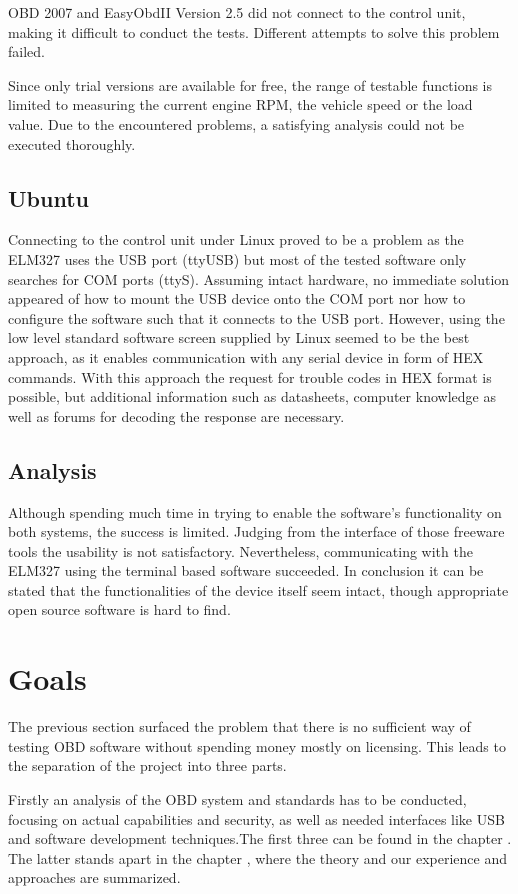 OBD 2007 and EasyObdII Version 2.5 did not connect to the control unit, making it difficult to conduct the tests. 
Different attempts to solve this problem failed.

Since only trial versions are available for free, the range of testable functions is limited to measuring the current engine RPM, the vehicle 
speed or the load value. Due to the encountered problems, a satisfying analysis could not be executed thoroughly.

\subsection{Ubuntu}
Connecting to the control unit under Linux proved to be a problem as the ELM327 uses the USB port (ttyUSB) but most of the tested software only 
searches for COM ports (ttyS).
Assuming intact hardware, no immediate solution appeared of how to mount the USB device onto the COM port nor how to configure the software such that 
it connects to the USB port. However, using the low level standard software screen supplied by Linux seemed to be the best approach, as it enables 
communication with any serial device in form of HEX commands. With this approach the request for trouble codes in HEX format is possible, but 
additional information such as datasheets, computer knowledge as well as forums for decoding the response are necessary.

\subsection{Analysis}
Although spending much time in trying to enable the software’s functionality on both systems, the success is limited. Judging from the interface of 
those freeware tools the usability is not satisfactory. Nevertheless, communicating with the ELM327 using the terminal based software succeeded. 
In conclusion it can be stated that the functionalities of the device itself seem intact, though appropriate open source software is hard to 
find.

\section{Goals}

The previous section surfaced the problem that there is no sufficient
way of testing OBD software without spending money mostly on
licensing. This leads to the separation of the project
into three parts.

Firstly an analysis of the OBD system and standards has to be conducted, focusing on actual capabilities and security, as well as needed interfaces 
like USB and software development techniques.The first three can be found in the chapter . The latter stands apart in the chapter 
, where the theory and our experience and approaches are summarized.

